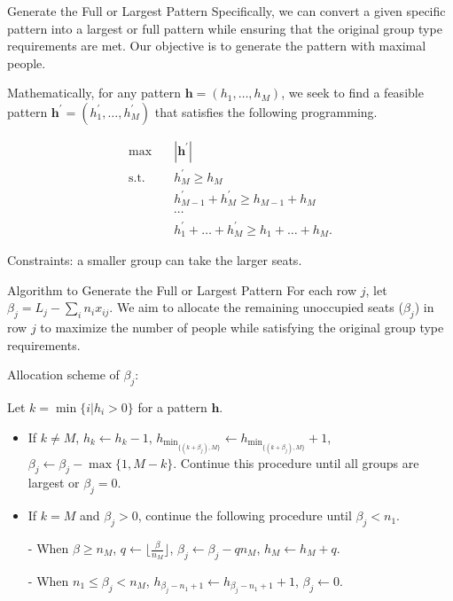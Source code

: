  \begin{frame}{Generate the Full or Largest Pattern}
    Specifically, we can convert a given specific pattern into a largest or full pattern while ensuring that the original group type requirements are met. Our objective is to generate the pattern with maximal people.

    Mathematically, for any pattern $\bm{h} = (h_1, \ldots, h_M)$, we seek to find a feasible pattern $\bm{h}^{'} = (h_1^{'}, \ldots, h_M^{'})$ that satisfies the following programming.

    \begin{equation*}\label{full_largest}
      \begin{aligned}
      \max \quad & |\bm{h}^{'}| \\
      \text {s.t.} \quad & h_M^{'} \geq h_M \\
      &  h_{M-1}^{'} + h_M^{'} \geq h_{M-1} + h_M \\
      & \cdots \\
      & h_1^{'} + \ldots + h_M^{'} \geq h_1 + \ldots + h_M.
      \end{aligned}
    \end{equation*}

    Constraints: a smaller group can take the larger seats.
  \end{frame}

  \begin{frame}{Algorithm to Generate the Full or Largest Pattern}
    For each row $j$, let $\beta_{j} = L_{j} - \sum_{i} n_{i} x_{ij}$. We aim to allocate the remaining unoccupied seats ($\beta_{j}$) in row $j$ to maximize the number of people while satisfying the original group type requirements.
    \vspace{0.5cm}
    
    Allocation scheme of $\beta_{j}$:
    \vspace{0.5cm}

    \begin{scriptsize}
      Let $k = \min\{i | h_i > 0\}$ for a pattern $\bm{h}$.

      \begin{itemize}
        \item If $k \neq M$, $h_{k} \gets h_{k} -1$, $h_{\min_{\{(k+\beta_{j}), M\}}} \gets h_{\min_{\{(k+\beta_{j}), M\}}} +1$, $\beta_{j} \gets \beta_{j} - \max\{1, M - k\}$. Continue this procedure until all groups are largest or $\beta_{j} =0$. 
        \item If $k = M$ and $\beta_{j} > 0$, continue the following procedure until $\beta_{j} < n_{1}$.
        \item[-] When $\beta \geq n_{M}$, $q \gets \lfloor\frac{\beta}{n_M}\rfloor$, $\beta_{j} \gets \beta_{j} - q n_M$, $h_{M} \gets h_{M} + q$.
        \item[-] When $n_{1} \leq \beta_{j} < n_{M}$, $h_{\beta_{j}-n_1+1} \gets h_{\beta_{j}-n_1+1} + 1$, $\beta_{j} \gets 0$.
      \end{itemize}  
    \end{scriptsize}
    
  \end{frame}